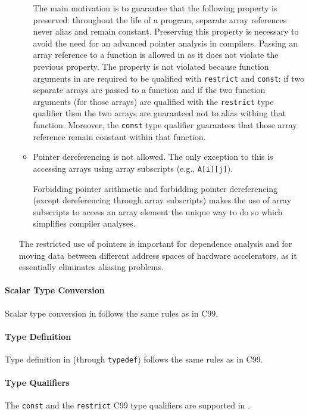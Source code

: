 \begin{itemize}
\begin{itemize}
      The main motivation is to guarantee that the following property is
      preserved:
      throughout the life of a \pencil program, separate array references
      never alias and remain constant.
      Preserving this property is necessary to avoid the need for an
      advanced pointer
      analysis in \pencil compilers.
      Passing an array reference to a function is allowed in \pencil as it does not violate the previous
      property.  The property is not violated because function arguments in \pencil are required to be
      qualified with \lstinline!restrict! and \lstinline!const!:
      if two separate arrays are passed to a function and if the two
      function arguments (for those arrays) are qualified with the
      \lstinline!restrict! type qualifier then the two arrays are guaranteed
      not to alias withing that function.
      Moreover, the \lstinline!const! type qualifier guarantees
      that those array reference remain constant within that function.

    \item Pointer dereferencing is not allowed.  The only exception to
      this is accessing arrays using array subscripts
      (e.g., \lstinline!A[i][j]!).

      Forbidding pointer arithmetic and forbidding pointer dereferencing
      (except dereferencing through array subscripts) makes the use of
      array subscripts to access an array element the unique way to do so
      which simplifies compiler analyses.
  \end{itemize}
    The restricted use of pointers is important for dependence analysis and
    for moving data between
    different address spaces of hardware accelerators, as it essentially
    eliminates aliasing problems.
 \end{itemize}

\paragraph{Scalar Type Conversion}
Scalar type conversion in \pencil follows the same rules as in C99.

\paragraph{Type Definition}
Type definition in \pencil (through \lstinline!typedef!) follows the same
rules as in C99.

\paragraph{Type Qualifiers}
The \lstinline!const! and the \lstinline!restrict! C99 type qualifiers are
supported in \pencil.

